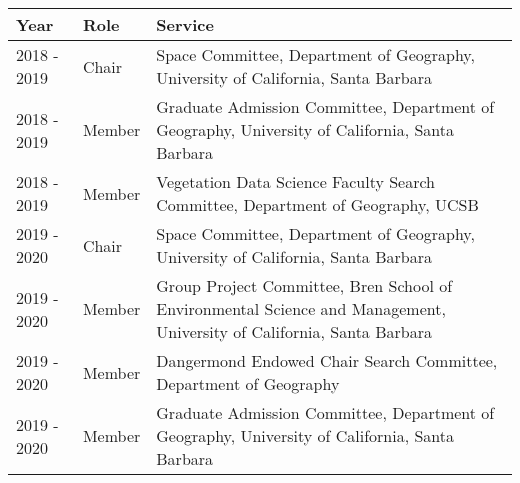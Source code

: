
\begin{longtable}{llp{12cm}}
Year & Role & Service\\
\hline 
\endhead 
2018 - 2019 & Chair & Space Committee, Department of Geography, University of California, Santa Barbara \\
2018 - 2019 & Member & Graduate Admission Committee, Department of Geography, University of California, Santa Barbara \\
2018 - 2019 & Member & Vegetation Data Science Faculty Search Committee, Department of Geography, UCSB \\
2019 - 2020 & Chair & Space Committee, Department of Geography, University of California, Santa Barbara \\
2019 - 2020 & Member & Group Project Committee, Bren School of Environmental Science and Management, University of California, Santa Barbara \\
2019 - 2020 & Member & Dangermond Endowed Chair Search Committee, Department of Geography \\
2019 - 2020 & Member & Graduate Admission Committee, Department of Geography, University of California, Santa Barbara \\
\end{longtable}


